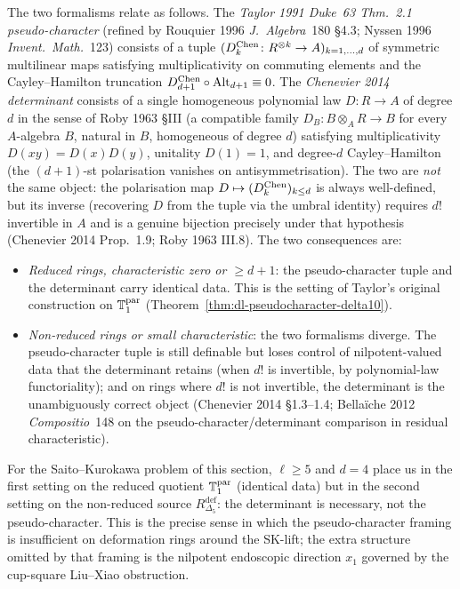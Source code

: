\begin{remark}
\label{rem:dl-pseudo-vs-det-resolution}
The two formalisms relate as follows. The
\emph{Taylor 1991 \emph{Duke}\ 63 Thm.~2.1 pseudo-character} (refined
by Rouquier 1996 \emph{J.~Algebra}\ 180 \S4.3;
Nyssen 1996 \emph{Invent.\ Math.}\ 123) consists of a tuple
$(D^{\mathrm{Chen}}_k\colon R^{\otimes k}\to A)_{k=1,\dots,d}$ of symmetric
multilinear maps satisfying multiplicativity on commuting elements
and the Cayley--Hamilton truncation
$D^{\mathrm{Chen}}_{d+1}\circ\mathrm{Alt}_{d+1}\equiv 0$. The
\emph{Chenevier 2014 determinant} consists of a single homogeneous
polynomial law $D\colon R\to A$ of degree $d$ in the sense of
Roby 1963 \S III (a compatible family
$D_B\colon B\otimes_A R\to B$ for every $A$-algebra $B$, natural in
$B$, homogeneous of degree $d$) satisfying multiplicativity
$D(xy)=D(x)D(y)$, unitality $D(1)=1$, and degree-$d$ Cayley--Hamilton
(the $(d+1)$-st polarisation vanishes on antisymmetrisation). The
two are \emph{not} the same object: the polarisation map
$D\mapsto (D^{\mathrm{Chen}}_k)_{k\le d}$ is always well-defined, but its inverse
(recovering $D$ from the tuple via the umbral identity) requires
$d!$ invertible in $A$ and is a genuine bijection precisely under
that hypothesis (Chenevier 2014 Prop.~1.9; Roby 1963 III.8).
The two consequences are:
\begin{itemize}
\item \emph{Reduced rings, characteristic zero or $\ge d+1$}: the
 pseudo-character tuple and the determinant carry identical data.
 This is the setting of Taylor's original construction on $\mathbb{T}^{\mathrm{par}}_1$
 (Theorem~\ref{thm:dl-pseudocharacter-delta10}).
\item \emph{Non-reduced rings or small characteristic}: the two
 formalisms diverge. The pseudo-character tuple is still definable
 but loses control of nilpotent-valued data that the determinant
 retains (when $d!$ is invertible, by polynomial-law functoriality);
 and on rings where $d!$ is not invertible, the determinant is the
 unambiguously correct object (Chenevier 2014 \S1.3--1.4; Bellaï\-che
 2012 \emph{Compositio}\ 148 on the pseudo-character/determinant
 comparison in residual characteristic).
\end{itemize}
For the Saito--Kurokawa problem of this section, $\ell\ge 5$ and
$d=4$ place us in the first setting on the reduced quotient $\mathbb{T}^{\mathrm{par}}_1$
(identical data) but in the second setting on the non-reduced source
$R^{\mathrm{def}}_{\Delta_5}$: the determinant is necessary, not the
pseudo-character. This is the precise sense in which the pseudo-character
framing is insufficient on deformation rings around the SK-lift;
the extra structure omitted by that framing is the nilpotent endoscopic
direction $x_1$ governed by the cup-square Liu--Xiao obstruction.
\end{remark}

